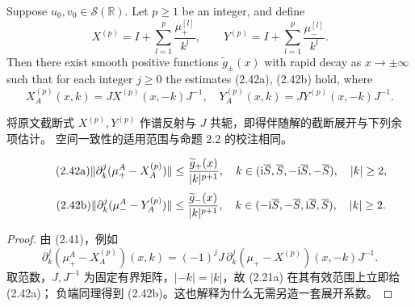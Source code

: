 \begin{paperpropositionen}\label{prop:2.6}
Suppose $u_0,v_0\in\mathcal S(\mathbb R)$. Let $p\ge1$ be an integer, and define
\[
X^{(p)}=I+\sum\limits_{l=1}^p\dfrac{\mu_+^{[l]}}{k^l},\qquad
Y^{(p)}=I+\sum\limits_{l=1}^p\dfrac{\mu_-^{[l]}}{k^l}.
\]
Then there exist smooth positive functions $\widetilde g_\pm(x)$ with rapid decay as $x\to\pm\infty$ such that for each integer $j\ge0$ the estimates (2.42a), (2.42b) hold, where
\[
X_A^{(p)}(x,k)=JX^{(p)}(x,-k)J^{-1},\quad
Y_A^{(p)}(x,k)=JY^{(p)}(x,-k)J^{-1}.
\]
\end{paperpropositionen}
\begin{paperpropositioncn*}
将原文截断式 $X^{(p)},Y^{(p)}$ 作谱反射与 $J$ 共轭，即得伴随解的截断展开与下列余项估计。
空间一致性的适用范围与命题 2.2 的校注相同。
\end{paperpropositioncn*}
\begin{equation}
\originaleq{2.42a}
\|\partial_k^j(\mu_+^A-X_A^{(p)})\|
\le\dfrac{\widetilde g_+(x)}{|k|^{p+1}},\quad
k\in(\ii\overline S,\overline S,-\ii\overline S,-\overline S),\quad |k|\ge2,
\end{equation}
\begin{equation}
\originaleq{2.42b}
\|\partial_k^j(\mu_-^A-Y_A^{(p)})\|
\le\dfrac{\widetilde g_-(x)}{|k|^{p+1}},\quad
k\in(-\ii\overline S,-\overline S,\ii\overline S,\overline S),\quad |k|\ge2.
\end{equation}
\begin{proof}
由 (2.41)，例如
\[
\partial_k^j(\mu_+^A-X_A^{(p)})(x,k)
=(-1)^jJ\,\partial_k^j(\mu_+-X^{(p)})(x,-k)J^{-1}.
\]
取范数，$J,J^{-1}$ 为固定有界矩阵，$|-k|=|k|$，故 (2.21a) 在其有效范围上立即给 (2.42a)；
负端同理得到 (2.42b)。这也解释为什么无需另造一套展开系数。
\end{proof}

